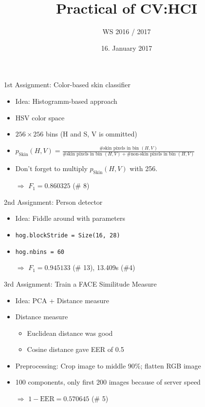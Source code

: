 \documentclass{beamer}
\title{Practical of CV:HCI}
\subtitle{WS 2016 / 2017}
\author[Martin\,Thoma \& Bettina\,Weller\& Yang\,Zhang]
{%
  \texorpdfstring{
    \begin{columns}%
      \column{.30\linewidth}
      \centering
      Martin Thoma\      \href{mailto:info@martin-thoma.de}{info@martin-thoma.de}
      \column{.30\linewidth}
      \centering
      Bettina Weller\    %
      \column{.30\linewidth}
      \centering
      Yang Zhang\    %
    \end{columns}
  }
  {John Doe \& Jane Doe}
}
\date{16. January 2017}
\begin{document}
\frame{\titlepage}

\begin{frame}{1st Assignment: Color-based skin classifier}
    \begin{itemize}
        \item Idea: Histogramm-based approach
        \item HSV color space
        \item $256 \times 256$ bins (H and S, V is ommitted)
        \item $p_\text{Skin}(H, V) = \frac{\text{\# skin pixels in bin } (H, V)}{\text{\# skin pixels in bin } (H, V) + \text{\# non-skin pixels in bin } (H, V)}$
        \item Don't forget to multiply $p_\text{Skin}(H, V)$ with 256.
        \item[$\Rightarrow$] $F_1 = 0.860325$ (\# 8)
    \end{itemize}
\end{frame}

\begin{frame}{2nd Assignment: Person detector}
    \begin{itemize}
        \item Idea: Fiddle around with parameters
        \item \texttt{hog.blockStride = Size(16, 28)}
        \item \texttt{hog.nbins = 60}
        \item[$\Rightarrow$] $F_1 = 0.945133$ (\# 13), 13.409s (\#4)
    \end{itemize}
\end{frame}

\begin{frame}{3rd Assignment: Train a FACE Similitude Measure}
    \begin{itemize}
        \item Idea: PCA + Distance measure
        \item Distance measure
        \begin{itemize}
            \item Euclidean distance was good
            \item Cosine distance gave EER of 0.5
        \end{itemize}
        \item Preprocessing: Crop image to middle 90\%; flatten RGB image
        \item 100 components, only first 200 images because of server speed
        \item[$\Rightarrow$] $1- \text{EER} = 0.570645$ (\# 5)
    \end{itemize}
\end{frame}
\end{document}
